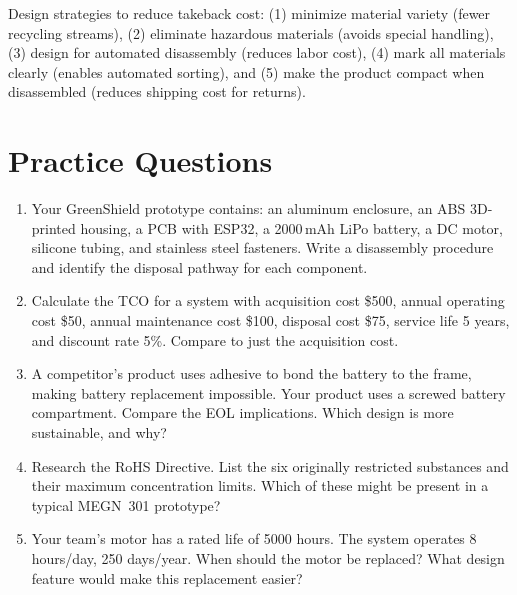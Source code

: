 Design strategies to reduce takeback cost: (1) minimize material variety (fewer recycling streams), (2) eliminate hazardous materials (avoids special handling), (3) design for automated disassembly (reduces labor cost), (4) mark all materials clearly (enables automated sorting), and (5) make the product compact when disassembled (reduces shipping cost for returns).
\section{Practice Questions}
\begin{enumerate}[leftmargin=1.5em]
\item Your GreenShield prototype contains: an aluminum enclosure, an ABS 3D-printed housing, a PCB with ESP32, a 2000\,mAh LiPo battery, a DC motor, silicone tubing, and stainless steel fasteners. Write a disassembly procedure and identify the disposal pathway for each component.
\item Calculate the TCO for a system with acquisition cost \$500, annual operating cost \$50, annual maintenance cost \$100, disposal cost \$75, service life 5 years, and discount rate 5\%. Compare to just the acquisition cost.
\item A competitor's product uses adhesive to bond the battery to the frame, making battery replacement impossible. Your product uses a screwed battery compartment. Compare the EOL implications. Which design is more sustainable, and why?
\item Research the RoHS Directive. List the six originally restricted substances and their maximum concentration limits. Which of these might be present in a typical MEGN~301 prototype?
\item Your team's motor has a rated life of 5000 hours. The system operates 8 hours/day, 250 days/year. When should the motor be replaced? What design feature would make this replacement easier?
\end{enumerate}

